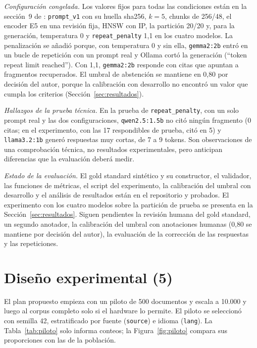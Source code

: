 \documentclass[conference]{IEEEtran}
\begin{document}
\textit{Configuración congelada.} Los valores fijos para todas las condiciones están en la sección~9 de : \texttt{prompt\_v1} con su huella sha256, $k=5$, chunks de 256/48, el encoder E5 en una revisión fija, HNSW con IP, la partición 20/20 y, para la generación, temperatura 0 y \texttt{repeat\_penalty} 1,1 en los cuatro modelos. La penalización se añadió porque, con temperatura 0 y sin ella, \texttt{gemma2:2b} entró en un bucle de repetición con un prompt real y Ollama cortó la generación (``token repeat limit reached''). Con 1,1, \texttt{gemma2:2b} responde con citas que apuntan a fragmentos recuperados. El umbral de abstención se mantiene en 0,80 por decisión del autor, porque la calibración con desarrollo no encontró un valor que cumpla los criterios (Sección~\ref{sec:resultados}).

\textit{Hallazgos de la prueba técnica.} En la prueba de \texttt{repeat\_penalty}, con un solo prompt real y las dos configuraciones, \texttt{qwen2.5:1.5b} no citó ningún fragmento (0 citas; en el experimento, con las 17 respondibles de prueba, citó en 5) y \texttt{llama3.2:1b} generó respuestas muy cortas, de 7 a 9 tokens. Son observaciones de una comprobación técnica, no resultados experimentales, pero anticipan diferencias que la evaluación deberá medir.

\textit{Estado de la evaluación.} El gold standard sintético y su constructor, el validador, las funciones de métricas, el script del experimento, la calibración del umbral con desarrollo y el análisis de resultados están en el repositorio y probados. El experimento con los cuatro modelos sobre la partición de prueba se presenta en la Sección~\ref{sec:resultados}. Siguen pendientes la revisión humana del gold standard, un segundo anotador, la calibración del umbral con anotaciones humanas (0,80 se mantiene por decisión del autor), la evaluación de la corrección de las respuestas y las repeticiones.

\section{Diseño experimental (5)}
El plan propuesto empieza con un piloto de 500 documentos y escala a 10.000 y luego al corpus completo solo si el hardware lo permite. El piloto se seleccionó con semilla 42, estratificado por fuente (\texttt{source}) e idioma (\texttt{lang}). La Tabla~\ref{tab:piloto} solo informa conteos; la Figura~\ref{fig:piloto} compara sus proporciones con las de la población.
\end{document}
